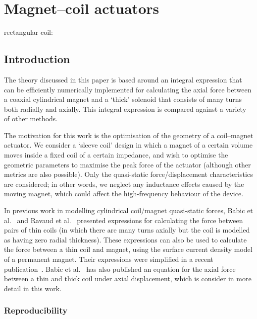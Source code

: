 \chapter{Magnet--coil actuators}

rectangular coil: \textcite{rovers2010-ietm}




\section{Introduction}

The theory discussed in this paper is based around an integral expression that can be efficiently numerically implemented for calculating the axial force between a coaxial cylindrical magnet and a `thick' solenoid that consists of many turns both radially and axially.
This integral expression is compared against a variety of other methods.

The motivation for this work is the optimisation of the geometry of a coil--magnet actuator.
We consider a `sleeve coil' design in which a magnet of a certain volume moves inside a fixed coil of a certain impedance, and wish to optimise the geometric parameters to maximise the peak force of the actuator (although other metrics are also possible).
Only the quasi-static force/displacement characteristics are considered; in other words, we neglect any inductance effects caused by the moving magnet, which could affect the high-frequency behaviour of the device.

In previous work in modelling cylindrical coil/magnet quasi-static forces, Babic et al.~\cite{babic2008-ietm} and Ravaud et al.~\cite{ravaud2010-pier} presented expressions for calculating the force between pairs of thin coils (in which there are many turns axially but the coil is modelled as having zero radial thickness). These expressions can also be used to calculate the force between a thin coil and magnet, using the surface current density model of a permanent magnet.
Their expressions were simplified in a recent publication~\cite{robertson2011-ietm}.
Babic et al.~\cite{babic2011-ietm} has also published an equation for the axial force between a thin and thick coil under axial displacement, which is consider in more detail in this work.

\subsection{Reproducibility}

